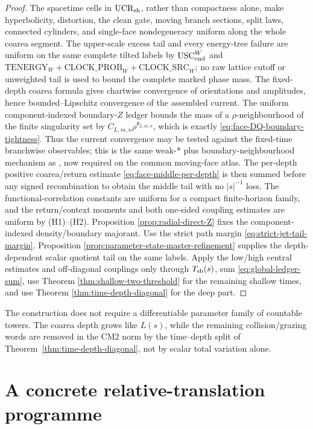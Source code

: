 \documentclass[11pt]{article}
\begin{document}
\begin{proof}
The spacetime cells in $\mathrm{UCR}_{\rm sh}$, rather than compactness alone, make
hyperbolicity, distortion, the clean gate, moving branch sections, split
laws, connected cylinders, and single-face nondegeneracy uniform along the
whole coarea segment.  The
upper-scale excess tail and every energy-tree failure are uniform on the
same complete tilted labels by $\mathrm{USC}_{\rm end}^{W}$ and
$\mathrm{TENERGY}_{W}+\mathrm{CLOCK\_PROB}_{W}
+\mathrm{CLOCK\_SRC}_{W}$; no raw lattice cutoff or unweighted tail is used to
bound the complete marked phase mass.  The
fixed-depth coarea formula gives chartwise convergence of orientations and
amplitudes, hence bounded--Lipschitz convergence of the assembled current.
The uniform component-indexed boundary-$Z$ ledger bounds the mass of a
$\rho$-neighbourhood of the finite singularity set by
$C_{L,m,n}\rho^{\theta_{L,m,n}}$, which is exactly
\eqref{eq:face-DQ-boundary-tightness}.  Thus the current convergence may be
tested against the fixed-time branchwise observables; this is the same
weak-* plus boundary-neighbourhood mechanism as
\cite[Lemma~5.4]{CanestrariHoles}, now required on the common moving-face
atlas.  The per-depth positive coarea/return estimate
\eqref{eq:face-middle-per-depth} is then summed before any signed
recombination to obtain the middle tail with no $|s|^{-1}$ loss.  The
functional-correlation constants are uniform for a compact finite-horizon
family, and the return/context moments and both one-sided coupling estimates
are uniform by \textup{(H1)--(H2)}.  Proposition
\ref{prop:radial-direct-Z} fixes the component-indexed density/boundary
majorant.  Use the strict path margin
\eqref{eq:strict-jet-tail-margin}.  Proposition
\ref{prop:parameter-state-master-refinement} supplies the
depth-dependent scalar quotient tail on the same labels.  Apply the low/high
central estimates and off-diagonal couplings only through $T_{\rm sh}(s)$,
sum \eqref{eq:global-ledger-sum}, use Theorem
\ref{thm:shallow-two-threshold} for the remaining shallow times, and use Theorem
\ref{thm:time-depth-diagonal} for the deep part.
\end{proof}

The construction does not require a differentiable parameter family of
countable towers.  The coarea depth grows like $L(s)$, while the remaining
collision/grazing words are removed in the CM2 norm by the time--depth split
of Theorem~\ref{thm:time-depth-diagonal}, not by scalar total variation alone.

\section{A concrete relative-translation programme}
\end{document}
